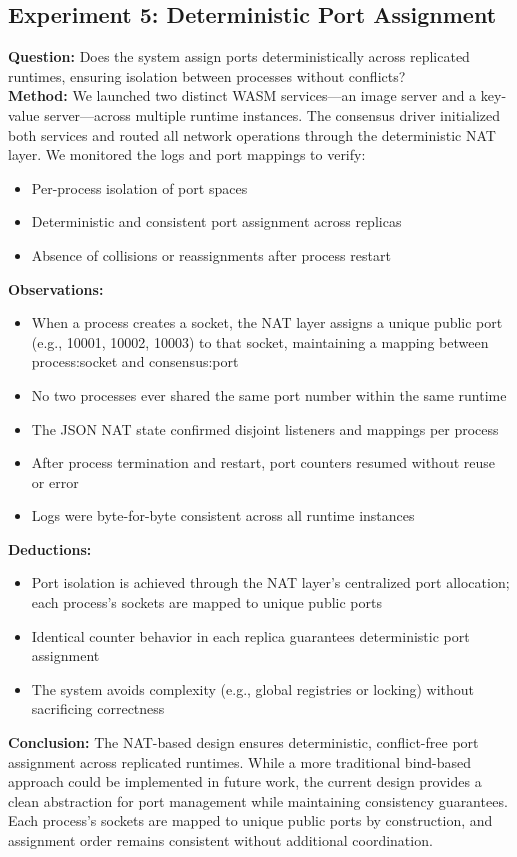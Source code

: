 \documentclass[10pt]{IEEEtran}
\begin{document}
\subsection{Experiment 5: Deterministic Port Assignment}
\textbf{Question:} Does the system assign ports deterministically across replicated runtimes, ensuring isolation between processes without conflicts? \\
\textbf{Method:} We launched two distinct WASM services—an image server and a key-value server—across multiple runtime instances. The consensus driver initialized both services and routed all network operations through the deterministic NAT layer. We monitored the logs and port mappings to verify:
\begin{itemize}
    \item Per-process isolation of port spaces
    \item Deterministic and consistent port assignment across replicas
    \item Absence of collisions or reassignments after process restart
\end{itemize}
\textbf{Observations:}
\begin{itemize}
    \item When a process creates a socket, the NAT layer assigns a unique public port (e.g., 10001, 10002, 10003) to that socket, maintaining a mapping between process:socket and consensus:port
    \item No two processes ever shared the same port number within the same runtime
    \item The JSON NAT state confirmed disjoint listeners and mappings per process
    \item After process termination and restart, port counters resumed without reuse or error
    \item Logs were byte-for-byte consistent across all runtime instances
\end{itemize}
\textbf{Deductions:}
\begin{itemize}
    \item Port isolation is achieved through the NAT layer's centralized port allocation; each process's sockets are mapped to unique public ports
    \item Identical counter behavior in each replica guarantees deterministic port assignment
    \item The system avoids complexity (e.g., global registries or locking) without sacrificing correctness
\end{itemize}
\textbf{Conclusion:} The NAT-based design ensures deterministic, conflict-free port assignment across replicated runtimes. While a more traditional bind-based approach could be implemented in future work, the current design provides a clean abstraction for port management while maintaining consistency guarantees. Each process's sockets are mapped to unique public ports by construction, and assignment order remains consistent without additional coordination.
\end{document}
